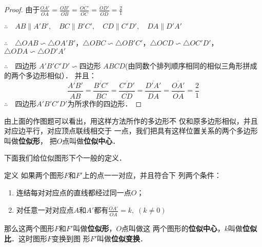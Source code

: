 \begin{figure}[htp]
    \centering
{}
    \caption{}
\end{figure}

\begin{proof}
由于$\frac{\overline{OA'}}{\overline{OA}}=\frac{\overline{OB'}}{\overline{OB}}=\frac{\overline{OC'}}{\overline{OC}}=\frac{\overline{OD'}}{\overline{OD}}=\frac{2}{1}$

$\therefore\quad AB\parallel A'B',\quad BC\parallel B'C',\quad 
CD\parallel C'D',\quad DA\parallel D'A'$

$\therefore\quad \triangle OAB\backsim \triangle OA'B'$，$ 
\triangle OBC\backsim \triangle OB'C'$，$ 
\triangle OCD\backsim \triangle OC'D'$，$ 
\triangle ODA\backsim \triangle OD'A'$

$\therefore\quad $四边形 $A'B'C'D'\backsim $四边形 $ABCD$(由同数个排列顺序相同的相似三角形拼成的两个多边形相似）．
并且：
\[\frac{\overline{A'B'}}{\overline{AB}}=\frac{\overline{B'C'}}{\overline{BC}}=\frac{\overline{C'D'}}{\overline{CD}}=\frac{\overline{D'A'}}{\overline{DA}}=\frac{\overline{OA'}}{\overline{OA}}=\frac{2}{1}\]
$\therefore\quad $四边形$A'B'C'D'$为所求作的四边形．
\end{proof}

由上面的作图题可以看出，用这样方法所作的多边形不
仅和原多边形相似，并且对应边平行，对应顶点联线相交于
一点，我们把具有这样位置关系的两个多边形叫做\textbf{位似形}，
把$O$点叫做\textbf{位似中心}．

下面我们给位似图形下个一般的定义．

\begin{blk}
    {定义} 如果两个图形$F$和$F'$上的点一一对应，并且符合下
列两个条件：
\begin{enumerate}
    \item 连结每对对应点的直线都经过同一点$O$；
    \item 对任意一对对应点$A$和$A'$都有$\frac{\overline{OA'}}{\overline{OA}}=k,\; (k\ne 0)$
\end{enumerate}
那么这两个图形$F$和$F'$叫做\textbf{位似形}，$O$点叫做这
两个图形的\textbf{位似中心}，$k$叫做\textbf{位似比}．这时图形$F$变换到图
形$F'$叫做\textbf{位似变换}．
\end{blk}


